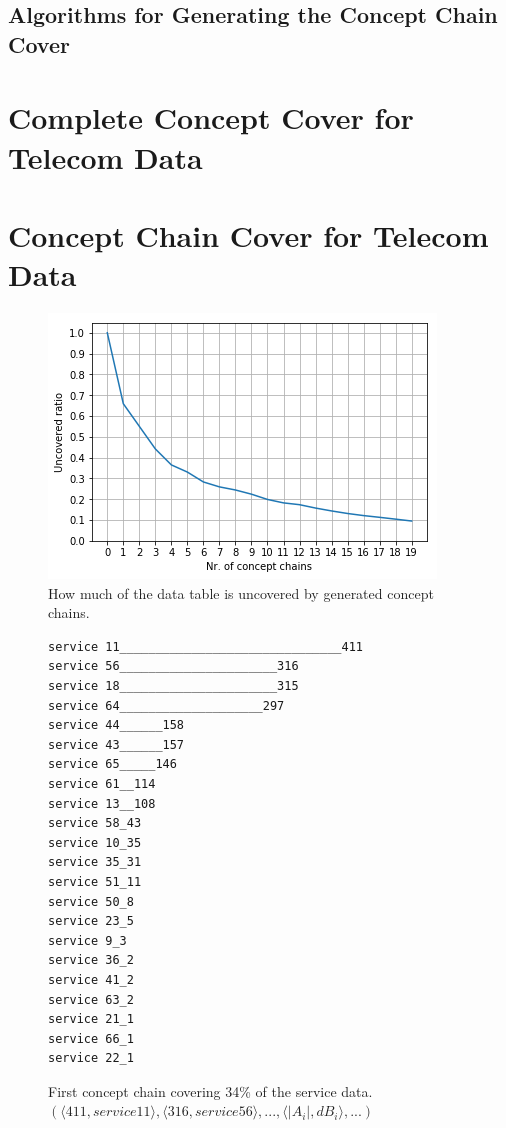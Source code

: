 \documentclass[acmconf,authordraft]{acmart}
\begin{document}
\subsection{Algorithms for Generating the Concept Chain Cover}

\section{Complete Concept Cover for Telecom Data}

\section{Concept Chain Cover for Telecom Data}

\begin{figure}[ht]
  \centering
  \includegraphics[width=\linewidth]{telia_ccc}
  \caption{How much of the data table is uncovered by generated concept chains.}
\end{figure}


\begin{figure}[!htb]
\vspace{.5cm}
\begin{verbatim}
service 11_______________________________411
service 56______________________316
service 18______________________315
service 64____________________297
service 44______158
service 43______157
service 65_____146
service 61__114
service 13__108
service 58_43
service 10_35
service 35_31
service 51_11
service 50_8
service 23_5
service 9_3
service 36_2
service 41_2
service 63_2
service 21_1
service 66_1
service 22_1
\end{verbatim}

\caption{First concept chain covering 34\% of the service data. $(\langle 411, service 11 \rangle,\langle 316, service 56 \rangle,  ..., \langle |A_i|, dB_i \rangle, ...)$}
\label{fig:ccc_1}
\end{figure}
\end{document}
